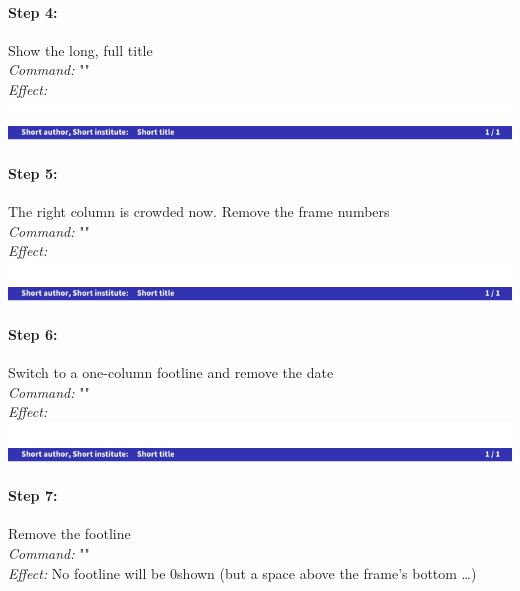 \documentclass[11pt]{ltxdoc}
\begin{document}
	\paragraph{Step 4:} Show the long, full title \\
	\textit{Command:} "" \\
	\textit{Effect:} \\
	\includegraphics[page=8, width=\textwidth, trim=0 0 0 15, clip]{hackthefootline-examples}
	
	\paragraph{Step 5:} The right column is crowded now. Remove the frame numbers \\
	\textit{Command:} "" \\
	\textit{Effect:} \\
	\includegraphics[page=9, width=\textwidth, trim=0 0 0 15, clip]{hackthefootline-examples}
	
	\paragraph{Step 6:} Switch to a one-column footline and remove the date \\
	\textit{Command:} "" \\
	\textit{Effect:} \\
	\includegraphics[page=10, width=\textwidth, trim=0 0 0 15, clip]{hackthefootline-examples}
	
	\paragraph{Step 7:} Remove the footline \\
	\textit{Command:} "" \\
	\textit{Effect:} No footline will be 0shown (but a space above the frame's bottom …)
\end{document}
